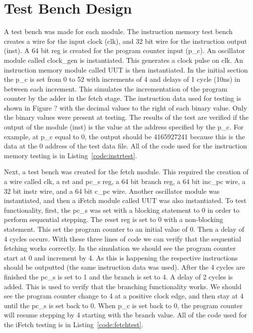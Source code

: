 \documentclass{article}
\newcommand{\Verilog}[3]{
  \lstset{language=Verilog}
  \lstset{backgroundcolor=\color{listinggray},rulecolor=\color{blue}}
  \lstset{linewidth=\textwidth}
  \lstset{commentstyle=\textit, stringstyle=\upshape,showspaces=false}
  \lstset{frame=tb}
  
}
\begin{document}
\section{Test Bench Design}
A test bench was made for each module. The instruction memory test bench creates a wire for the input clock (clk), and 32 bit wire for the instruction output (inst). A 64 bit reg is created for the program counter input (p\_c). An oscillator module called clock\_gen is instantiated. This generates a clock pulse on clk. An instruction memory module called UUT is then instantiated. In the initial section the p\_c is set from 0 to 52 with increments of 4 and delays of 1 cycle (10ns) in between each increment. This simulates the incrementation of the program counter by the adder in the fetch stage. The instruction data used for testing is shown in Figure ? with the decimal values to the right of each binary value. Only the binary values were present at testing. The results of the test are verified if the output of the module (inst) is the value at the address specified by the p\_c. For example, at p\_c equal to 0, the output should be 4165927241 because this is the data at the 0 address of the test data file. All of the code used for the instruction memory testing is in Listing~\ref{code:instrtest}.
\Verilog{Verilog code for testing the fetch stage.}{code:instrtest}{../code/1_fetch/instr_mem_test.v} 

Next, a test bench was created for the fetch module. This required the creation of a wire called clk, a rst and pc\_s reg, a 64 bit branch reg, a 64 bit inc\_pc wire, a 32 bit instr wire, and a 64 bit c\_pc wire. Another oscillator module was instantiated, and then a iFetch module called UUT was also instantiated. To test functionality, first, the pc\_s was set with a blocking statement to 0 in order to perform sequential stepping. The reset reg is set to 0 with a non-blocking statement. This set the program counter to an initial value of 0. Then a delay of 4 cycles occurs. With these three lines of code we can verify that the sequential fetching works correctly. In the simulation we should see the program counter start at 0 and increment by 4. As this is happening the respective instructions should be outputted (the same instruction data was used). After the 4 cycles are finished the pc\_s is set to 1 and the branch is set to 4. A delay of 2 cycles is added. This is used to verify that the branching functionality works. We should see the program counter change to 4 at a positive clock edge, and then stay at 4 until the pc\_s is set back to 0. When p\_c is set back to 0, the program counter will resume stepping by 4 starting with the branch value. All of the code used for the iFetch testing is in Listing~\ref{code:fetchtest}.
\end{document}
